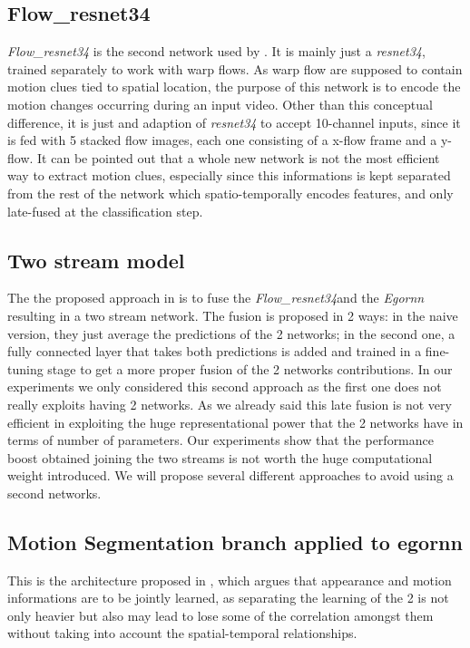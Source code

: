 \documentclass[10pt,twocolumn,hidelinks,letterpaper]{article}
\begin{document}
\subsection{Flow\_resnet34}

\textit{Flow\_resnet34} is the second network used by \cite{egornn}. It is mainly just a \textit{resnet34}, trained separately to work with warp flows. As
warp flow are supposed to contain motion clues tied to spatial location, the purpose of this network is to encode the motion changes occurring during an input video. Other than this conceptual difference, it is just and adaption of \textit{resnet34} to accept 10-channel inputs, since it is fed with 5 stacked flow images, each one consisting of a x-flow frame and a y-flow. It can be pointed out that a whole new network is not the most efficient way to extract motion clues, especially since this informations is kept separated from the rest of the network which spatio-temporally encodes features, and only late-fused at the classification step.


\subsection{Two stream model}

The the proposed approach in \cite{egornn} is to fuse the \textit{Flow\_resnet34}and the \textit{Egornn} resulting in a two stream network. The fusion is proposed in 2 ways: in the naive version, they just average the predictions of the 2 networks; in the second one, a fully connected layer that takes both predictions is added and trained in a fine-tuning stage to get a more proper fusion of the 2 networks contributions. In our experiments we only considered this second approach as the first one does not really exploits having 2 networks.
As we already said this late fusion is not very efficient in exploiting the huge representational power that the 2 networks have in terms of number of parameters.
Our experiments show that the performance boost obtained joining the two streams is not worth the huge computational weight introduced. We will propose several different approaches to avoid using a second networks.


\subsection{Motion Segmentation branch applied to egornn}

This is the architecture proposed in \cite{sparnet}, which argues that appearance and motion informations are to be jointly learned, as separating the learning of the 2 is not only heavier but also may lead to lose some of the correlation amongst them without taking into account the spatial-temporal relationships.
\end{document}
